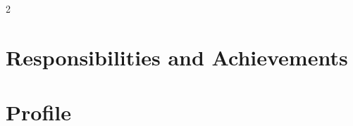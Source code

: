 \documentclass[11pt,a4paper]{article}
\newif\ifshowreferences
\begin{document}


\renderprofileheader

\vspace{0.55em}

\setlength{\columnsep}{1.1cm}
\setlength{\columnseprule}{0.45pt}
\begin{paracol}{2}


\vspace{1.5em}

\section{Responsibilities and Achievements}


\switchcolumn

\section{Profile}
\smallmuted{\RaggedRight\ProfileSummary\par}
\vspace{1.5em}


\vspace{1.5em}


\vspace{1.5em}

\ifshowreferences
\section{References}
\smallmuted{Available on request.}\par
\fi
\end{paracol}
\end{document}
